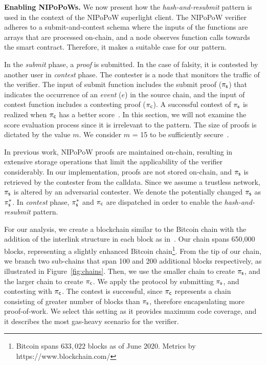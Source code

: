 \noindent \textbf{Enabling NIPoPoWs.} We now present how the
\emph{hash-and-resubmit} pattern is used in the context of the NIPoPoW
superlight client. The NIPoPoW verifier adheres to a submit-and-contest schema
where the inputs of the functions are arrays that are processed on-chain, and a
node observes function calls towards the smart contract.  Therefore, it
makes a suitable case for our pattern.

In the \emph{submit} phase, a \emph{proof} is submitted. In the case of falsity, it
is contested by another user in \emph{contest} phase. The contester is a node
that monitors the traffic of the verifier. The input of \textsf{submit}
function includes the submit proof ($\mathsf{\pi_{s}}$) that indicates the occurrence of an
\emph{event} ($e$) in the source chain, and the input of \textsf{contest}
function includes a contesting proof ($\mathsf{\pi_{c}}$). A successful contest of $\mathsf{\pi_{s}}$
is realized when $\mathsf{\pi_{c}}$ has a better score~\cite{nipopows}. In this section, we
will not examine the score evaluation process since it is irrelevant to the
pattern. The size of proofs is dictated by the value $m$. We consider $m$ = 15
to be sufficiently secure~\cite{nipopows}.

In previous work, NIPoPoW proofs are maintained on-chain, resulting in
extensive storage operations that limit the applicability of the verifier
considerably. In our implementation, proofs are not stored on-chain, and $\mathsf{\pi_{s}}$
is retrieved by the contester from the calldata. Since we
assume a trustless network, $\mathsf{\pi_{s}}$ is altered by an adversarial contester. We denote
the potentially changed $\mathsf{\pi_{s}}$ as $\mathsf{\pi_{s}^*}$. In \emph{contest} phase, $\mathsf{\pi_{s}^*}$ and
$\mathsf{\pi_{c}}$ are dispatched in order to enable the \emph{hash-and-resubmit} pattern.

For our analysis, we create a blockchain similar to the Bitcoin chain with the
addition of the interlink structure in each block as in~\cite{gglou}. Our chain
spans 650,000 blocks, representing a slightly enhanced Bitcoin
chain\footnote{Bitcoin spans $633{,}022$ blocks as of June 2020. Metrics by
https://www.blockchain.com/}. From the tip of our chain, we branch two
sub-chains that span 100 and 200 additional blocks respectively, as illustrated
in Figure~\ref{fig:chains}. Then, we use the smaller chain to create $\mathsf{\pi_{s}}$,
and the larger chain to create $\mathsf{\pi_{c}}$. We apply the protocol by submitting
$\mathsf{\pi_{s}}$, and contesting with $\mathsf{\pi_{c}}$. The contest is successful, since $\mathsf{\pi_{c}}$
represents a chain consisting of greater number of blocks than $\mathsf{\pi_{s}}$,
therefore encapsulating more proof-of-work. We select this setting as it
provides maximum code coverage, and it describes the most gas-heavy scenario
for the verifier.

